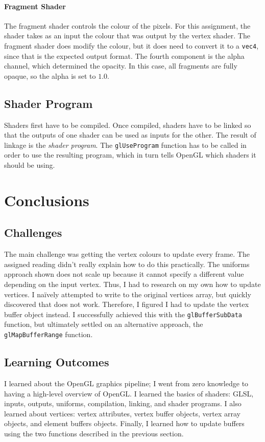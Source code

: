 \documentclass[a4paper, 12pt]{scrartcl}
\begin{document}
\paragraph{Fragment Shader}
The fragment shader controls the colour of the pixels. For this assignment, the shader takes as an input the colour that was output by the vertex shader. The fragment shader does modify the colour, but it does need to convert it to a \texttt{vec4}, since that is the expected output format. The fourth component is the alpha channel, which determined the opacity. In this case, all fragments are fully opaque, so the alpha is set to $1.0$.

\subsection{Shader Program}
Shaders first have to be compiled. Once compiled, shaders have to be linked so that the outputs of one shader can be used as inputs for the other. The result of linkage is the \textit{shader program}. The \texttt{glUseProgram} function has to be called in order to use the resulting program, which in turn tells OpenGL which shaders it should be using.

\section{Conclusions}
\subsection{Challenges}
The main challenge was getting the vertex colours to update every frame. The assigned reading didn't really explain how to do this practically. The uniforms approach shown does not scale up because it cannot specify a different value depending on the input vertex. Thus, I had to research on my own how to update vertices. I naïvely attempted to write to the original vertices array, but quickly discovered that does not work. Therefore, I figured I had to update the vertex buffer object instead. I successfully achieved this with the \texttt{glBufferSubData} function, but ultimately settled on an alternative approach, the \texttt{glMapBufferRange} function.

\subsection{Learning Outcomes}
I learned about the OpenGL graphics pipeline; I went from zero knowledge to having a high-level overview of OpenGL. I learned the basics of shaders: GLSL, inputs, outputs, uniforms, compilation, linking, and shader programs. I also learned about vertices: vertex attributes, vertex buffer objects, vertex array objects, and element buffers objects. Finally, I learned how to update buffers using the two functions described in the previous section.
\end{document}
